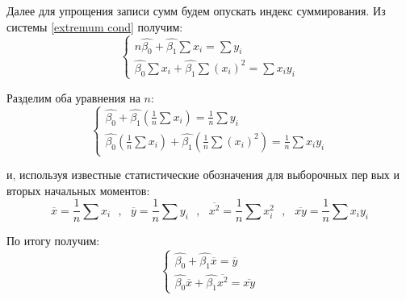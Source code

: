 \documentclass[a4paper]{article}
\begin{document}
        Далее для упрощения записи сумм будем опускать индекс суммирования. Из системы \ref{extremum cond} получим: \\
        
        \begin{equation} \label{extremum cond consequence}
            \begin{cases}
                n \widehat{\beta_0} + \widehat{\beta_1}\sum{x_i} = \sum{y_i} \\
                \widehat{\beta_0}\sum{x_i} + \widehat{\beta_1}\sum{(x_i)^2} = \sum{x_i y_i}
            \end{cases}
        \end{equation}
        
        Разделим оба уравнения на $n$: \\
        
        \begin{equation} \label{consequence div n}
            \begin{cases}
                \widehat{\beta_0} + \widehat{\beta_1} (\frac{1}{n} \sum{x_i}) = \frac{1}{n} \sum{y_i} \\
                \widehat{\beta_0}(\frac{1}{n} \sum{x_i}) + \widehat{\beta_1}(\frac{1}{n} \sum{(x_i)^2}) = \frac{1}{n} \sum{x_i y_i}
            \end{cases}
        \end{equation}
        
        и, используя известные статистические обозначения для выборочных первых и вторых начальных моментов: \\
        
        
        \begin{equation} \label{substitutions}
            \overline{x} = \frac{1}{n} \sum{x_i} \text{ }, \text{ } \overline{y} = \frac{1}{n} \sum{y_i} \text{ }, \text{ } \overline{x^2} = \frac{1}{n} \sum{x_i^2} \text{ }, \text{ } \overline{x y} = \frac{1}{n} \sum{x_i y_i} 
        \end{equation}
        
        По итогу получим: \\
        
        \begin{equation} \label{estimations system}
            \begin{cases}
                \widehat{\beta_0} + \widehat{\beta_1} \overline{x} = \overline{y} \\
                \widehat{\beta_0}\overline{x} + \widehat{\beta_1}\overline{x^2} = \overline{x y}
            \end{cases}
        \end{equation}
        
\end{document}
